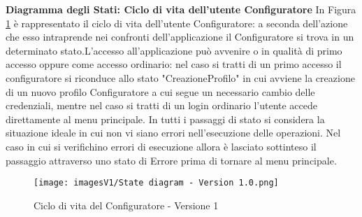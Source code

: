 \newpage
\textbf{Diagramma degli Stati: Ciclo di vita dell'utente Configuratore}\newline
In Figura \ref{fig:State diagram 1.1} è rappresentato il ciclo di vita dell'utente Configuratore: a seconda dell'azione che esso intraprende nei confronti dell'applicazione il Configuratore si trova in un determinato stato.\newline L'accesso all'applicazione può avvenire o in qualità di primo accesso oppure come accesso ordinario: nel caso si tratti di un primo accesso il configuratore si riconduce allo stato "CreazioneProfilo" in cui avviene la creazione di un nuovo profilo Configuratore a cui segue un necessario cambio delle credenziali, mentre nel caso si tratti di un login ordinario l'utente accede direttamente al menu principale. \newline 
In tutti i passaggi di stato si considera la situazione ideale in cui non vi siano errori nell'esecuzione delle operazioni. Nel caso in cui si verifichino errori di esecuzione allora è lasciato sottinteso il passaggio attraverso uno stato di Errore prima di tornare al menu principale.

\begin{figure}[b!]
\centering
\texttt{[image: imagesV1/State diagram - Version 1.0.png]}
\caption{\label{fig:State diagram 1.1}Ciclo di vita del Configuratore - Versione 1}
\end{figure}\bigskip
